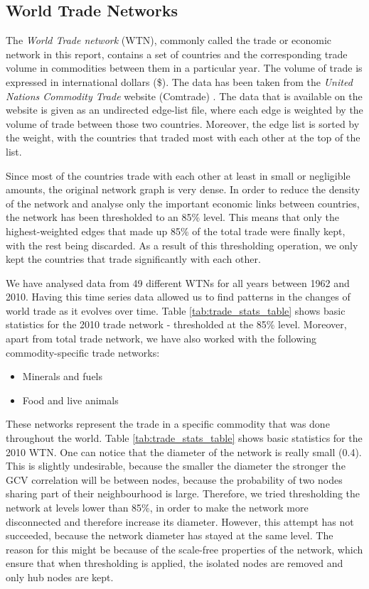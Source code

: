 \subsection{World Trade Networks}
\label{sec:trade_bck}

The \emph{World Trade network} (WTN), commonly called the trade or economic network in this report, contains a set of countries and the corresponding trade volume in commodities between them in a particular year. The volume of trade is expressed in international dollars (\$). The data has been taken from the \emph{United Nations Commodity Trade} website (Comtrade) \cite{comtrade}. The data that is available on the website is given as an undirected edge-list file, where each edge is weighted by the volume of trade between those two countries. Moreover, the edge list is sorted by the weight, with the countries that traded most with each other at the top of the list.

Since most of the countries trade with each other at least in small or negligible amounts, the original network graph is very dense. In order to reduce the density of the network and analyse only the important economic links between countries, the network has been thresholded to an 85\% level. This means that only the highest-weighted edges that made up 85\% of the total trade were finally kept, with the rest being discarded. As a result of this thresholding operation, we only kept the countries that trade significantly with each other.

We have analysed data from 49 different WTNs for all years between 1962 and 2010. Having this time series data allowed us to find patterns in the changes of world trade as it evolves over time. Table \ref{tab:trade_stats_table} shows basic statistics for the 2010 trade network - thresholded at the 85\% level. Moreover, apart from total trade network, we have also worked with the following commodity-specific trade networks:
\begin{itemize}
 \item Minerals and fuels
 \item Food and live animals
\end{itemize}

These networks represent the trade in a specific commodity that was done throughout the world. Table \ref{tab:trade_stats_table} shows basic statistics for the 2010 WTN. One can notice that the diameter of the network is really small (0.4). This is slightly undesirable, because the smaller the diameter the stronger the GCV correlation will be between nodes, because the probability of two nodes sharing part of their neighbourhood is large. Therefore, we tried thresholding the network at levels lower than 85\%, in order to make the network more disconnected and therefore increase its diameter. However, this attempt has not succeeded, because the network diameter has stayed at the same level. The reason for this might be because of the scale-free properties of the network, which ensure that when thresholding is applied, the isolated nodes are removed and only hub nodes are kept.

